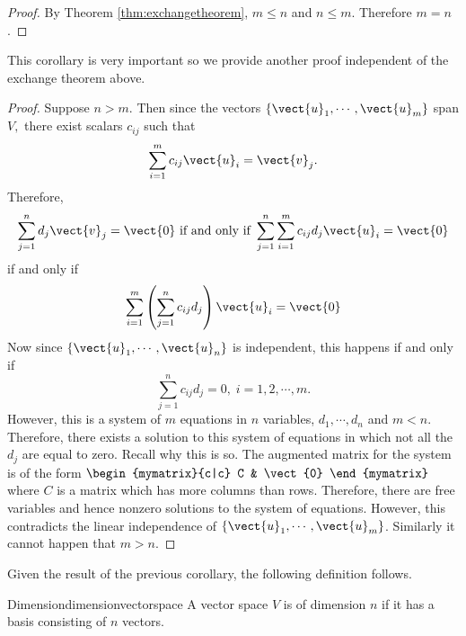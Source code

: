 \begin{proof} By Theorem \ref{thm:exchangetheorem}, $m\leq n$ and $n\leq m$. Therefore $m=n$. 
\end{proof}

This corollary is very important so we provide another proof independent of the exchange theorem above.

\begin{proof}Suppose $n > m.$ Then since the vectors $\left\{ \vect{u}
_{1},\cdots ,\vect{u}_{m}\right\} $ span $V,$ there exist scalars $c_{ij}$
such that 
\begin{equation*}
\sum_{i=1}^{m}c_{ij}\vect{u}_{i}=\vect{v}_{j}.
\end{equation*}
Therefore, 
\begin{equation*}
\sum_{j=1}^{n}d_{j}\vect{v}_{j}=\vect{0}
\text{ if and only if }\sum_{j=1}^{n}\sum_{i=1}^{m}c_{ij}d_{j}\vect{u}_{i}=
\vect{0}
\end{equation*}
if and only if 
\begin{equation*}
\sum_{i=1}^{m}\left( \sum_{j=1}^{n}c_{ij}d_{j}\right) \vect{u}_{i}=\vect{
0}
\end{equation*}
Now since $\{\vect{u}_{1},\cdots ,\vect{u}_{n}\}$ is independent, this
happens if and only if 
\begin{equation*}
\sum_{j=1}^{n}c_{ij}d_{j}=0,\;i=1,2,\cdots ,m.
\end{equation*}
However, this is a system of $m$ equations in $n$ variables, $d_{1},\cdots
,d_{n}$ and $m<n.$ Therefore, there exists a solution to this system of
equations in which not all the $d_{j}$ are equal to zero. Recall why this is
so. The augmented matrix for the system is of the form 
$\begin{mymatrix}{c|c}
C & \vect{0}
\end{mymatrix} $ where $C$ is a matrix which has more columns than rows. Therefore,
there are free variables and hence nonzero solutions to the system of
equations. However, this contradicts the linear independence of $\left\{ 
\vect{u}_{1},\cdots ,\vect{u}_{m}\right\} $. Similarly it cannot happen
that $m > n$.
\end{proof}

Given the result of the previous corollary, the following definition follows.

\begin{definition}{Dimension}{dimensionvectorspace}
 A vector space $V$ is of dimension $n$ if it has a basis consisting of $n$ vectors.
\end{definition}

